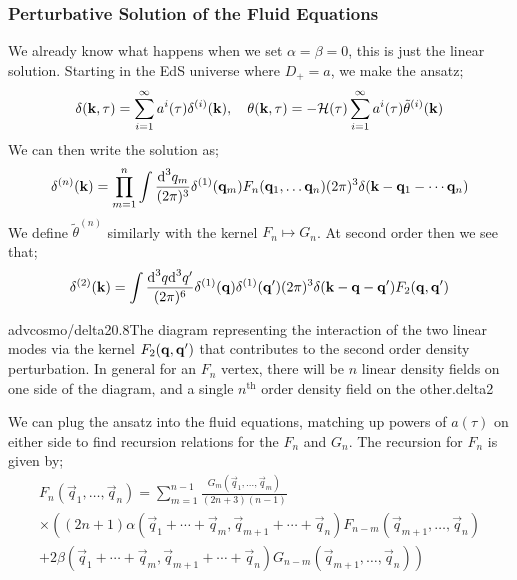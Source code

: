 \subsubsection{Perturbative Solution of the Fluid Equations}
We already know what happens when we set $\alpha = \beta = 0$, this is just the linear solution. Starting in the EdS universe where $D_+ = a$, we make the ansatz;
\begin{equation*}
\delta(\mathbf{k}, \tau) = \sum_{i = 1}^{\infty}{a^{i}(\tau)\delta^{(i)}(\mathbf{k})}, \quad \theta(\mathbf{k}, \tau) = -\mathcal{H}(\tau)\sum_{i = 1}^{\infty}{a^{i}(\tau)\tilde{\theta}^{(i)}(\mathbf{k})}
\end{equation*}
We can then write the solution as;
\begin{equation}
\delta^{(n)}(\mathbf{k}) = \prod_{m = 1}^{n}{\int{\frac{\text{d}^3 q_m}{(2\pi)^3}\delta^{(1)}(\mathbf{q}_m)}}F_n(\mathbf{q}_1, \ldots \mathbf{q}_n)(2\pi)^3 \delta(\mathbf{k} - \mathbf{q}_1 - \cdots \mathbf{q}_n)
\end{equation}
We define $\tilde{\theta}^{(n)}$ similarly with the kernel $F_n \mapsto G_n$. At second order then we see that;
\begin{equation*}
\delta^{(2)}(\mathbf{k}) = \int{\frac{\text{d}^3 q\text{d}^3 q^{\prime}}{(2\pi)^6}\delta^{(1)}(\mathbf{q})\delta^{(1)}(\mathbf{q}^{\prime})(2\pi)^3 \delta(\mathbf{k} - \mathbf{q} - \mathbf{q}^{\prime})F_2(\mathbf{q}, \mathbf{q}^{\prime})}
\end{equation*}
\begin{mygraphic}{advcosmo/delta2}{0.8}{The diagram representing the interaction of the two linear modes via the kernel $F_2(\mathbf{q}, \mathbf{q}^{\prime})$ that contributes to the second order density perturbation. In general for an $F_n$ vertex, there will be $n$ linear density fields on one side of the diagram, and a single $n^{\text{th}}$ order density field on the other.}{delta2}\end{mygraphic}
We can plug the ansatz into the fluid equations, matching up powers of $a(\tau)$ on either side to find recursion relations for the $F_n$ and $G_n$. The recursion for $F_n$ is given by;
\begin{multline}
F_n(\vec{q}_1, \ldots, \vec{q}_n) = \sum_{m = 1}^{n - 1}{\frac{G_m(\vec{q}_1, \ldots, \vec{q}_m)}{(2n + 3)(n - 1)}}\\ \times \left((2n + 1)\alpha(\vec{q}_1 + \cdots + \vec{q}_m, \vec{q}_{m + 1} + \cdots + \vec{q}_n)F_{n - m}(\vec{q}_{m + 1}, \ldots, \vec{q}_n)\right. \\ \left. + 2\beta(\vec{q}_1 + \cdots + \vec{q}_m, \vec{q}_{m + 1} + \cdots  + \vec{q}_n)G_{n - m}(\vec{q}_{m + 1}, \ldots, \vec{q}_n)\right)
\end{multline}
